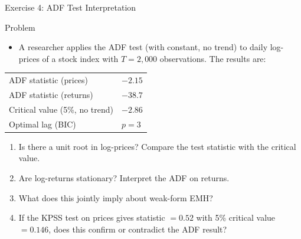 \documentclass[9pt, aspectratio=169, t]{beamer}
\theoremstyle{definition}
\newenvironment{cminipage}[1]{%
    \par\noindent\hfill\begin{minipage}{#1}\ignorespaces
}{%
    \end{minipage}\hfill\null\par
}
\begin{document}
\begin{frame}{Exercise 4: ADF Test Interpretation}
\begin{cminipage}{0.95\textwidth}
\begin{block}{Problem}
\begin{itemize}
\item A researcher applies the ADF test (with constant, no trend) to daily log-prices of a stock index with $T = 2{,}000$ observations. The results are:
\end{itemize}
\begin{center}
{\small
\renewcommand{\arraystretch}{1.2}
\begin{tabular}{ll}
\toprule
ADF statistic (prices) & $-2.15$ \\
ADF statistic (returns) & $-38.7$ \\
Critical value (5\%, no trend) & $-2.86$ \\
Optimal lag (BIC) & $p = 3$ \\
\bottomrule
\end{tabular}
}
\end{center}
\end{block}
\begin{enumerate}
    \item Is there a unit root in log-prices? Compare the test statistic with the critical value.
    \item Are log-returns stationary? Interpret the ADF on returns.
    \item What does this jointly imply about weak-form EMH?
    \item If the KPSS test on prices gives statistic $= 0.52$ with 5\% critical value $= 0.146$, does this confirm or contradict the ADF result?
\end{enumerate}
\end{cminipage}
\end{frame}
\end{document}
